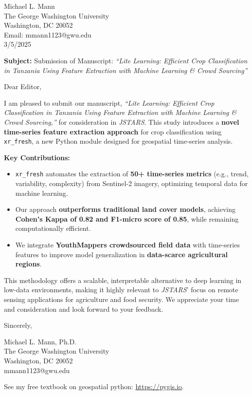 \documentclass{article}
\begin{document}
\noindent
Michael L. Mann \\
The George Washington University \\
Washington, DC 20052 \\
Email: mmann1123@gwu.edu \\
3/5/2025  

\vspace{1cm}
 
\noindent
\textbf{Subject:} Submission of Manuscript: \textit{``Lite Learning: Efficient Crop Classification in Tanzania Using Feature Extraction with Machine Learning \& Crowd Sourcing''}

\vspace{0.5cm}
\noindent
Dear Editor,  

I am pleased to submit our manuscript, \textit{``Lite Learning: Efficient Crop Classification in Tanzania Using Feature Extraction with Machine Learning \& Crowd Sourcing,''} for consideration in \textit{JSTARS}. This study introduces a \textbf{novel time-series feature extraction approach} for crop classification using \texttt{xr\_fresh}, a new Python module designed for geospatial time-series analysis.  

\vspace{0.3cm}

\noindent \textbf{Key Contributions:}
\begin{itemize}
    \item \texttt{xr\_fresh} automates the extraction of \textbf{50+ time-series metrics} (e.g., trend, variability, complexity) from Sentinel-2 imagery, optimizing temporal data for machine learning.
    \item Our approach \textbf{outperforms traditional land cover models}, achieving \textbf{Cohen’s Kappa of 0.82 and F1-micro score of 0.85}, while remaining computationally efficient.
    \item We integrate \textbf{YouthMappers crowdsourced field data} with time-series features to improve model generalization in \textbf{data-scarce agricultural regions}.
\end{itemize}

\noindent
This methodology offers a  scalable, interpretable alternative to deep learning in low-data environments, making it highly relevant to \textit{JSTARS}' focus on remote sensing applications for agriculture and food security.  We appreciate your time and consideration and look forward to your feedback.  

\vspace{0.5cm}
\noindent
Sincerely,  

\vspace{0.5cm}
\noindent
Michael L. Mann, Ph.D. \\
The George Washington University \\
Washington, DC 20052 \\
mmann1123@gwu.edu \\
\vspace{2.5cm}

\noindent
See my free textbook on geospatial python: \url{https://pygis.io}.
\end{document}
